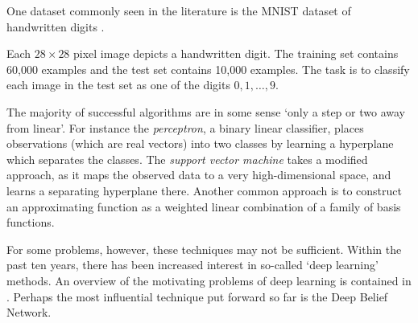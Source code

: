 \documentclass[11pt,titlepage]{article}
\numberwithin{equation}{section}
\begin{document}
    \begin{example} 
    One dataset commonly seen in the literature is the MNIST dataset of
    handwritten digits \cite{MNIST}.
    \begin{center}
    \end{center}
    Each $28\times28$ pixel image depicts a handwritten digit.  The training set
    contains 60,000 examples and the test set contains 10,000 examples.  The
    task is to classify each image in the test set as one of the digits
    $0,1,\ldots,9$.
    \end{example}

    The majority of successful algorithms are in some sense `only a step or two
    away from linear'.  For instance the \emph{perceptron}, a binary linear
    classifier, places observations (which are real vectors) into two classes by
    learning a hyperplane which separates the classes.  The \emph{support vector
    machine} takes a modified approach, as it maps the observed data to a very
    high-dimensional space, and learns a separating hyperplane there.  Another
    common approach is to construct an approximating function as a weighted
    linear combination of a family of basis functions.

    For some problems, however, these techniques may not be sufficient.  Within
    the past ten years, there has been increased interest in so-called `deep
    learning' methods.  An overview of the motivating problems of deep learning
    is contained in \cite{Ben09}.  Perhaps the most influential technique put
    forward so far is the Deep Belief Network.
\end{document}
